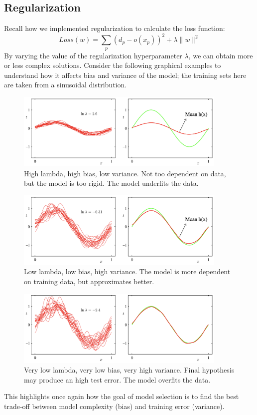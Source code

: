 \subsection{Regularization}

Recall how we implemented regularization to calculate the loss function:
\begin{equation*}
    Loss(w) = \sum_p (d_p - o(x_p))^2 + \lambda \|w\|^2
\end{equation*}
By varying the value of the regularization hyperparameter $\lambda$, we can obtain more or less complex solutions. Consider the following graphical examples to understand how it affects bias and variance of the model; the training sets here are taken from a sinusoidal distribution.

\begin{figure}[H]
    \centering
    \includegraphics[width=0.9\textwidth]{img/BiasVar1.png}
    \caption{High lambda, high bias, low variance. Not too dependent on data, but the model is too rigid. The model underfits the data.}
\end{figure}
\begin{figure}[H]
    \centering
    \includegraphics[width=0.9\textwidth]{img/BiasVar2.png}
    \caption{Low lambda, low bias, high variance. The model is more dependent on training data, but approximates better.}
\end{figure}
\begin{figure}[H]
    \centering
    \includegraphics[width=0.9\textwidth]{img/BiasVar3.png}
    \caption{Very low lambda, very low bias, very high variance. Final hypothesis may produce an high test error. The model overfits the data.}
\end{figure}
This highlights once again how the goal of model selection is to find the best trade-off between model complexity (bias) and training error (variance).

